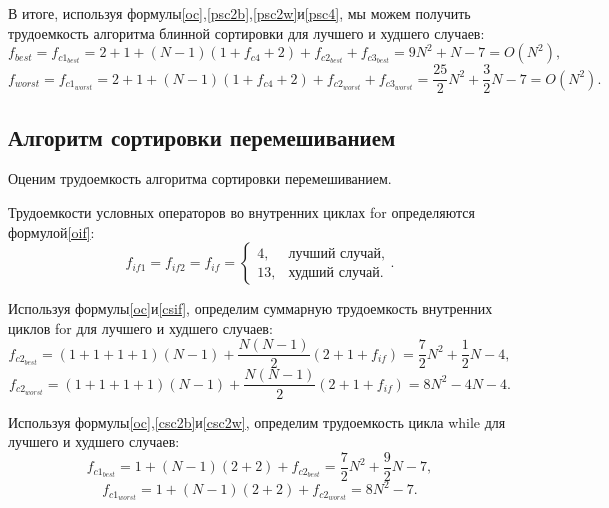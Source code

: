 В итоге, используя формулы\text{~}\eqref{oc},\text{~}\eqref{psc2b},\text{~}\eqref{psc2w}\text{~}и\text{~}\eqref{psc4}, мы можем получить трудоемкость алгоритма блинной сортировки для лучшего и худшего случаев:
\begin{equation}\label{psb}
	f_{best} = f_{c1_{best}} = 2 + 1 + (N - 1)(1 + f_{c4} + 2) + f_{c2_{best}} + f_{c3_{best}} = 9N^2 + N - 7 = O(N^2),
\end{equation}
\begin{equation}\label{psw}
	f_{worst} = f_{c1_{worst}} = 2 + 1 + (N - 1)(1 + f_{c4} + 2) + f_{c2_{worst}} + f_{c3_{worst}} = \frac{25}{2}N^2 + \frac{3}{2}N - 7 = O(N^2).
\end{equation}

\subsection{Алгоритм сортировки перемешиванием}

Оценим трудоемкость алгоритма сортировки перемешиванием.

Трудоемкости условных операторов во внутренних циклах for определяются формулой\text{~}\eqref{oif}:
\begin{equation}\label{csif}
	f_{if1} = f_{if2} = f_{if} =
	\begin{cases}
		4, &\text{лучший случай}, \\
		13, &\text{худший случай}.
	\end{cases}.
\end{equation}

Используя формулы\text{~}\eqref{oc}\text{~}и\text{~}\eqref{csif}, определим суммарную трудоемкость внутренних циклов for для лучшего и худшего случаев:
\begin{equation}\label{csc2b}
	f_{c2_{best}} = (1 + 1 + 1 + 1)(N - 1) + \frac{N(N - 1)}{2}(2 + 1 + f_{if}) = \frac{7}{2}N^2 + \frac{1}{2}N - 4,
\end{equation}
\begin{equation}\label{csc2w}
	f_{c2_{worst}} = (1 + 1 + 1 + 1)(N - 1) + \frac{N(N - 1)}{2}(2 + 1 + f_{if}) = 8N^2 - 4N - 4.
\end{equation}

Используя формулы\text{~}\eqref{oc},\text{~}\eqref{csc2b}\text{~}и\text{~}\eqref{csc2w}, определим трудоемкость цикла while для лучшего и худшего случаев:
\begin{equation}\label{csc1b}
	f_{c1_{best}} = 1 + (N - 1)(2 + 2) + f_{c2_{best}} = \frac{7}{2}N^2 + \frac{9}{2}N - 7,
\end{equation}
\begin{equation}\label{csc1w}
	f_{c1_{worst}} = 1 + (N - 1)(2 + 2) + f_{c2_{worst}} = 8N^2 - 7.
\end{equation}

